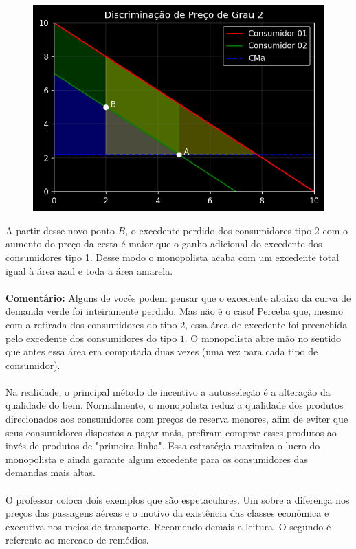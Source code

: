 \documentclass[a4paper,11pt,oneside]{book}
\theoremstyle{definition}
\theoremstyle{break}
\begin{document}
\begin{figure}[H]
\centering
\includegraphics[scale=0.8]{cap26_3-discriminacao_grau2_3.png}
\end{figure}

A partir desse novo ponto $B$, o excedente perdido dos consumidores tipo 2 com o aumento do preço da cesta é maior que o ganho adicional do excedente dos consumidores tipo 1. Desse modo o monopolista acaba com um excedente total igual à área azul e toda a área amarela.
\\
\\
\textbf{Comentário:} Alguns de vocês podem pensar que o excedente abaixo da curva de demanda verde foi inteiramente perdido. Mas não é o caso! Perceba que, mesmo com a retirada dos consumidores do tipo $2$, essa área de excedente foi preenchida pelo excedente dos consumidores do tipo $1$. O monopolista abre mão no sentido que antes essa área era computada duas vezes (uma vez para cada tipo de consumidor).
\\
\\
Na realidade, o principal método de incentivo a autosseleção é a alteração da qualidade do bem. Normalmente, o monopolista reduz a qualidade dos produtos direcionados aos consumidores com preços de reserva menores, afim de eviter que seus consumidores dispostos a pagar mais, prefiram comprar esses produtos ao invés de produtos de "primeira linha". Essa estratégia maximiza o lucro do monopolista e ainda garante algum excedente para os consumidores das demandas mais altas.
\\
\\
O professor coloca dois exemplos que são espetaculares. Um sobre a diferença nos preços das passagens aéreas e o motivo da existência das classes econômica e executiva nos meios de transporte. Recomendo demais a leitura. O segundo é referente ao mercado de remédios.
\end{document}
